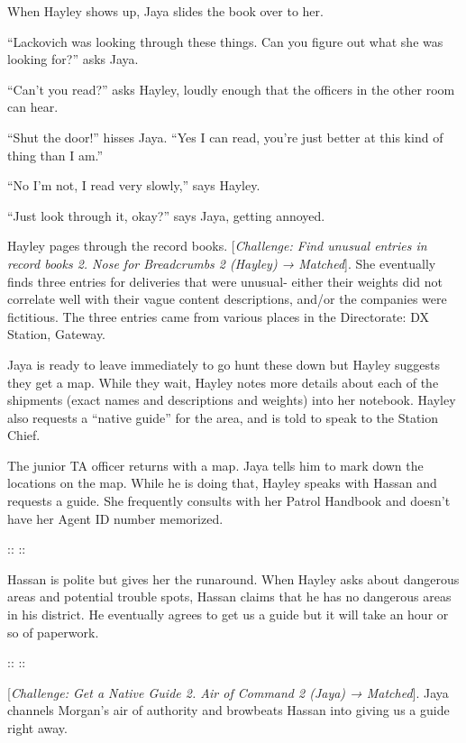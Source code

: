 When Hayley shows up, Jaya slides the book over to her.

``Lackovich was looking through these things.  Can you figure out what she was looking for?'' asks Jaya.

``Can't you read?'' asks Hayley, loudly enough that the officers in the other room can hear.

``Shut the door!'' hisses Jaya.  ``Yes I can read, you're just better at this kind of thing than I am.''

``No I'm not, I read very slowly,'' says Hayley.

``Just look through it, okay?'' says Jaya, getting annoyed.

Hayley pages through the record books.  {[}\textit{Challenge: Find unusual entries in record books 2.  Nose for Breadcrumbs 2 (Hayley) → Matched}{]}.  She eventually finds three entries for deliveries that were unusual- either their weights did not correlate well with their vague content descriptions, and/or the companies were fictitious.  The three entries came from various places in the Directorate: DX Station, Gateway.



Jaya is ready to leave immediately to go hunt these down but Hayley suggests they get a map.  While they wait, Hayley notes more details about each of the shipments (exact names and descriptions and weights) into her notebook.  Hayley also requests a ``native guide'' for the area, and is told to speak to the Station Chief.



The junior TA officer returns with a map.  Jaya tells him to mark down the locations on the map.  While he is doing that, Hayley speaks with Hassan and requests a guide.  She frequently consults with her Patrol Handbook and doesn't have her Agent ID number memorized.  

::  ::

Hassan is polite but gives her the runaround.  When Hayley asks about dangerous areas and potential trouble spots, Hassan claims that he has no dangerous areas in his district.  He eventually agrees to get us a guide but it will take an hour or so of paperwork.

::  ::

{[}\textit{Challenge: Get a Native Guide 2.  Air of Command 2 (Jaya) → Matched}{]}.  Jaya channels Morgan's air of authority and browbeats Hassan into giving us a guide right away.  



